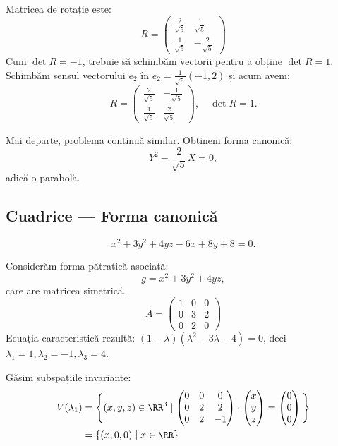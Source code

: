 Matricea de rotație este:
\[
  R = \begin{pmatrix}
    \frac{2}{\sqrt{5}} & \frac{1}{\sqrt{5}} \\
    \frac{1}{\sqrt{5}} & -\frac{2}{\sqrt{5}}
  \end{pmatrix}
\]
{\color{red}
Cum $\det R = -1$, trebuie să schimbăm vectorii pentru a obține $\det R = 1$.
Schimbăm sensul vectorului $e_2$ în $e_2 = \frac{1}{\sqrt{5}} (-1, 2)$ și acum avem:
\[
  R = \begin{pmatrix}
    \frac{2}{\sqrt{5}} & -\frac{1}{\sqrt{5}} \\
    \frac{1}{\sqrt{5}} & \frac{2}{\sqrt{5}}
  \end{pmatrix}, \quad \det R = 1.
\]}

Mai departe, problema continuă similar. Obținem forma canonică:
\[
  Y^2 - \frac{2}{\sqrt{5}} X = 0,
\]
adică o parabolă.


\subsection{Cuadrice --- Forma canonică}
\label{sec:cuadrice-can}

\[
  x^2 + 3y^2 + 4yz - 6x + 8y + 8 = 0.
\]

Considerăm forma pătratică asociată:
\[
  g = x^2 + 3y^2 + 4yz,
\]
care are matricea simetrică.
\[
  A = \begin{pmatrix}
    1 & 0 & 0 \\
    0 & 3 & 2 \\
    0 & 2 & 0
  \end{pmatrix}
\]
Ecuația caracteristică rezultă: $(1 - \lambda)(\lambda^2 - 3\lambda - 4) = 0$,
deci $\lambda_1 = 1, \lambda_2 = -1, \lambda_3 = 4$.

Găsim subspațiile invariante:
\begin{align*}
  V(\lambda_1) &= \Bigg\{ (x, y, z) \in \RR^3 \mid %
                 \begin{pmatrix}
                   0 & 0 & 0 \\
                   0 & 2 & 2 \\
                   0 & 2 & -1
                 \end{pmatrix} \cdot
                           \begin{pmatrix}
                             x \\ y \\ z
                           \end{pmatrix}  =
  \begin{pmatrix}
    0 \\ 0 \\ 0
  \end{pmatrix} \Bigg\} \\
               &= \{ (x, 0, 0) \mid x \in \RR \}
\end{align*}

